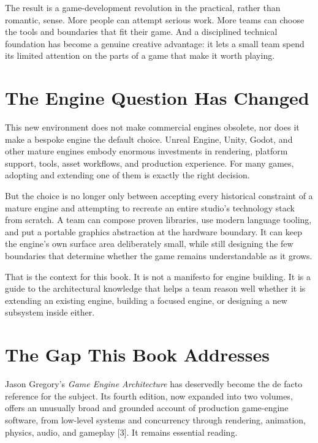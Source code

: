 \documentclass[
  11pt,
  letterpaper,
  DIV=11,
  numbers=noendperiod,
  twoside,
  open=right]{scrreprt}
\begin{document}
The result is a game-development revolution in the practical, rather
than romantic, sense. More people can attempt serious work. More teams
can choose the tools and boundaries that fit their game. And a
disciplined technical foundation has become a genuine creative
advantage: it lets a small team spend its limited attention on the parts
of a game that make it worth playing.

\section*{The Engine Question Has
Changed}\label{the-engine-question-has-changed}


This new environment does not make commercial engines obsolete, nor does
it make a bespoke engine the default choice. Unreal Engine, Unity,
Godot, and other mature engines embody enormous investments in
rendering, platform support, tools, asset workflows, and production
experience. For many games, adopting and extending one of them is
exactly the right decision.

But the choice is no longer only between accepting every historical
constraint of a mature engine and attempting to recreate an entire
studio's technology stack from scratch. A team can compose proven
libraries, use modern language tooling, and put a portable graphics
abstraction at the hardware boundary. It can keep the engine's own
surface area deliberately small, while still designing the few
boundaries that determine whether the game remains understandable as it
grows.

That is the context for this book. It is not a manifesto for engine
building. It is a guide to the architectural knowledge that helps a team
reason well whether it is extending an existing engine, building a
focused engine, or designing a new subsystem inside either.

\section*{The Gap This Book
Addresses}\label{the-gap-this-book-addresses}


Jason Gregory's \emph{Game Engine Architecture} has deservedly become
the de facto reference for the subject. Its fourth edition, now expanded
into two volumes, offers an unusually broad and grounded account of
production game-engine software, from low-level systems and concurrency
through rendering, animation, physics, audio, and gameplay {[}3{]}. It
remains essential reading.
\end{document}
